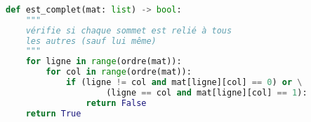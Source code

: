\documentclass[svgnames,11pt]{beamer}
\begin{document}
\begin{frame}[fragile]
    \frametitle{}
    \begin{center}
        \begin{lstlisting}[language=Python , basicstyle=\ttfamily\small, xleftmargin=0.2em, xrightmargin=-4em]
def est_complet(mat: list) -> bool:
    """
    vérifie si chaque sommet est relié à tous
    les autres (sauf lui même)
    """
    for ligne in range(ordre(mat)):
        for col in range(ordre(mat)):
            if (ligne != col and mat[ligne][col] == 0) or \
                    (ligne == col and mat[ligne][col] == 1):
                return False
    return True
\end{lstlisting}
        \label{CODE}
    \end{center}


\end{frame}
\end{document}
